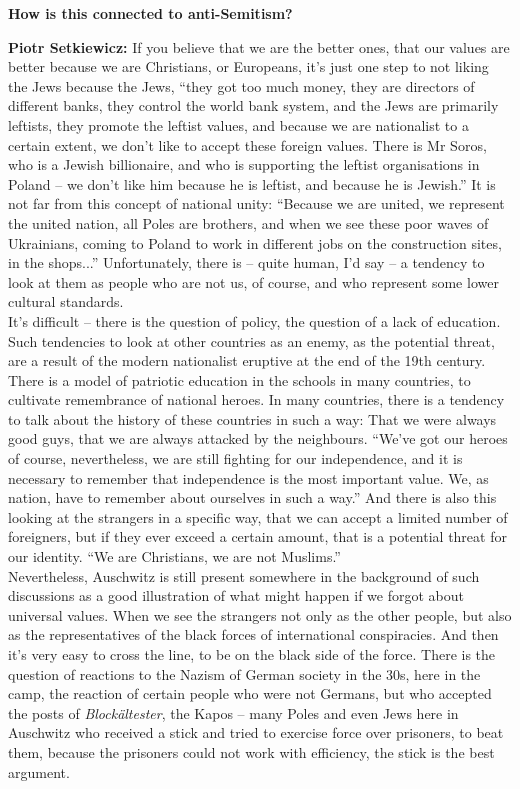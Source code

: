 \textbf{How is this connected to anti-Semitism?} 

\textbf{Piotr Setkiewicz:} If you believe that we are the better ones, that our values are better because we are Christians, or Europeans, it’s just one step to not liking the Jews because the Jews, ``they got too much money, they are directors of different banks, they control the world bank system, and the Jews are primarily leftists, they promote the leftist values, and because we are nationalist to a certain extent, we don’t like to accept these foreign values. There is Mr Soros, who is a Jewish billionaire, and who is supporting the leftist organisations in Poland – we don’t like him because he is leftist, and because he is Jewish.'' It is not far from this concept of national unity: ``Because we are united, we represent the united nation, all Poles are brothers, and when we see these poor waves of Ukrainians, coming to Poland to work in different jobs on the construction sites, in the shops...'' Unfortunately, there is – quite human, I’d say – a tendency to look at them as people who are not us, of course, and who represent some lower cultural standards. \\
It’s difficult – there is the question of policy, the question of a lack of education. Such tendencies to look at other countries as an enemy, as the potential threat, are a result of the modern nationalist eruptive at the end of the 19th century. There is a model of patriotic education in the schools in many countries,  to cultivate remembrance of national heroes. In many countries, there is a tendency to talk about the history of these countries in such a way: That we were always good guys, that we are always attacked by the neighbours. ``We’ve got our heroes of course, nevertheless, we are still fighting for our independence, and it is necessary to remember that independence is the most important value. We, as nation, have to remember about ourselves in such a way.'' And there is also this looking at the strangers in a specific way, that we can accept a limited number of foreigners, but if they ever exceed a certain amount, that is a potential threat for our identity. ``We are Christians, we are not Muslims.''\\
Nevertheless, Auschwitz is still present somewhere in the background of such discussions as a good illustration of what might happen if we forgot about universal values. When we see the strangers not only as the other people, but also as the representatives of the black forces of international conspiracies. And then it’s very easy to cross the line, to be on the black side of the force. There is the question of reactions to the Nazism of German society in the 30s, here in the camp, the reaction of certain people who were not Germans, but who accepted the posts of \textit{Blockältester}, the Kapos – many Poles and even Jews here in Auschwitz who received a stick and tried to exercise force over prisoners, to beat them, because the prisoners could not work with efficiency, the stick is the best argument.\\ 
